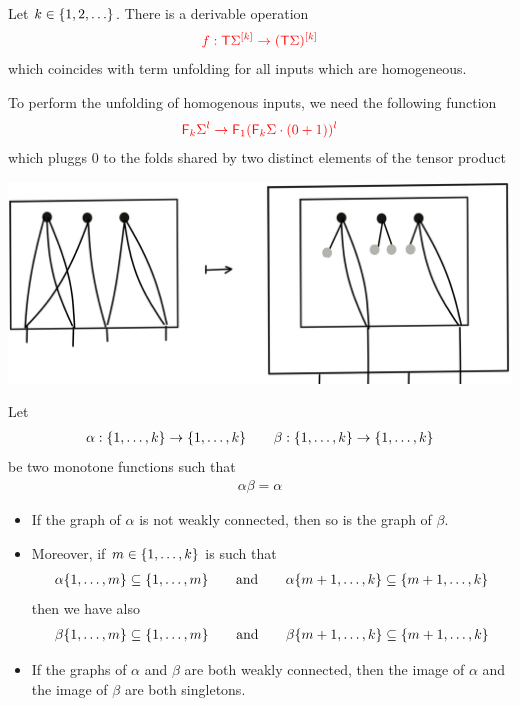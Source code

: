 \begin{lemma}\label{lem:homo-2-twist}
    Let $k \in \set{1,2,\ldots}$. There is a derivable operation 
    \begin{align*}
        \ranked{f : \tmonad \mati k \rSigma \to \mati k {(\tmonad \Sigma)} }
        \end{align*}      
which coincides with term unfolding for all inputs which are homogeneous.
\end{lemma}
To perform the unfolding of homogenous inputs, we need the following function
\begin{align*}
\ranked{\reduce k \Sigma^l \to \reduce 1 (\reduce k \Sigma\cdot(0+1))^l }
\end{align*}
which pluggs $0$ to the folds shared by two distinct elements of the tensor product
\begin{center}
\includegraphics[scale=.07]{MyPic34.jpg}
\end{center}

\begin{lemma}
Let
\begin{align*}
\alpha:\set{1,\dots,k}\to\set{1,\dots,k}\qquad
\beta:\set{1,\dots,k}\to\set{1,\dots,k}
\end{align*} 
be two monotone functions such that
\begin{align*}
\alpha\beta=\alpha
\end{align*}
\begin{itemize}
\item If the graph of $\alpha$ is not weakly connected, then so is the graph of $\beta$. 
\item Moreover, if $m\in \set{1,\dots, k}$ is such that 
\begin{align*}
\alpha\set{1,\dots,m}\subseteq \set{1,\dots,m} \qquad \text{and}\qquad 
\alpha\set{m+1,\dots,k}\subseteq \set{m+1,\dots,k}
\end{align*}
then we have also 
\begin{align*}
\beta\set{1,\dots,m}\subseteq \set{1,\dots,m} \qquad \text{and}\qquad 
\beta\set{m+1,\dots,k}\subseteq \set{m+1,\dots,k}
\end{align*}
\item If the graphs of $\alpha$ and $\beta$ are both weakly connected, then the image of $\alpha$ and the image of $\beta$ are both singletons.
\end{itemize}
\end{lemma}

